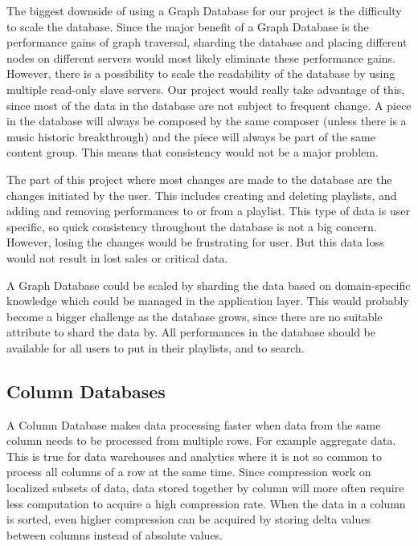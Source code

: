 The biggest downside of using a Graph Database for our project is the difficulty to scale the database. Since the major benefit of a Graph Database is the performance gains of graph traversal, sharding the database and placing different nodes on different servers would most likely eliminate these performance gains. However, there is a possibility to scale the readability of the database by using multiple read-only slave servers. Our project would really take advantage of this, since most of the data in the database are not subject to frequent change. A piece in the database will always be composed by the same composer (unless there is a music historic breakthrough) and the piece will always be part of the same content group. This means that consistency would not be a major problem.

The part of this project where most changes are made to the database are the changes initiated by the user. This includes creating and deleting playlists, and adding and removing performances to or from a playlist. This type of data is user specific, so quick consistency throughout the database is not a big concern. However, losing the changes would be frustrating for user. But this data loss would not result in lost sales or critical data.

A Graph Database could be scaled by sharding the data based on domain-specific knowledge which could be managed in the application layer. This would probably become a bigger challenge as the database grows, since there are no suitable attribute to shard the data by. All performances in the database should be available for all users to put in their playlists, and to search.

\subsection{Column Databases}
\label{analysis-col-db}

A Column Database makes data processing faster when data from the same column needs to be processed from multiple rows. For example aggregate data. This is true for data warehouses and analytics where it is not so common to process all columns of a row at the same time.
Since compression work on localized subsets of data, data stored together by column will more often require less computation to acquire a high compression rate. When the data in a column is sorted, even higher compression can be acquired by storing delta values between columns instead of absolute values.


